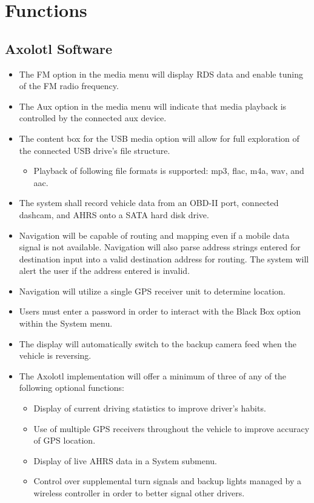 \documentclass[onecolumn, draftclsnofoot,10pt, compsoc]{IEEEtran}
\begin{document}
\section{Functions}
\subsection{Axolotl Software}
\begin{itemize}
	\item The FM option in the media menu will display RDS data and enable tuning of the FM radio frequency.
	\item The Aux option in the media menu will indicate that media playback is controlled by the connected aux device.
	\item The content box for the USB media option will allow for full exploration of the connected USB drive’s file structure.
	\begin{itemize}
		\item Playback of following file formats is supported: mp3, flac, m4a, wav, and aac.
	\end{itemize}
	\item The system shall record vehicle data from an OBD-II port, connected dashcam, and AHRS onto a SATA hard disk drive.
	\item Navigation will be capable of routing and mapping even if a mobile data signal is not available. Navigation will also parse address strings entered for destination input into a valid destination address for routing. The system will alert the user if the address entered is invalid.
	\item Navigation will utilize a single GPS receiver unit to determine location.
	\item Users must enter a password in order to interact with the Black Box option within the System menu.
	\item The display will automatically switch to the backup camera feed when the vehicle is reversing. 
	\item The Axolotl implementation will offer a minimum of three of any of the following optional functions:
	\begin{itemize}
		\item Display of current driving statistics to improve driver’s habits.
		\item Use of multiple GPS receivers throughout the vehicle to improve accuracy of GPS location.
		\item Display of live AHRS data in a System submenu.
		\item Control over supplemental turn signals and backup lights managed by a wireless controller in order to better signal other drivers.

\end{itemize}
\end{itemize}
\end{document}
